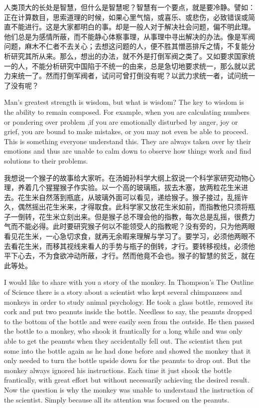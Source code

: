 {人类顶大的长处是智慧，但什么是智慧呢？智慧有一个要点，就是要冷静。譬如：正在计算数目，思索道理的时候，如果心里气恼，或喜乐、或悲伤，必致错误或简直不能进行。这是大家都明白的事。却是一般人对于解决社会问题，偏不明此理。他们总是为感情所蔽，而不能静心体察事理，从事理中寻出解决的办法。像是军阀问题，麻木不仁者不去关心；去想这问题的人，便不胜其憎恶排斥之情，不复能分析研究其所从来。那么，想出的办法，就不外是打倒军阀之类了。又如要求国家统一的人，不能分析研究中国陷于不统一的由来，总是急切地要求统一，那么就以武力来统一了。然而打倒军阀者，试问可曾打倒没有呢？以武力求统一者，试问统一了没有呢？
	
	Man's greatest strength is wisdom, but what is wisdom? The key to wisdom is the ability to remain composed. For example, when you are calculating numbers or pondering over problem ,if you are emotionally disturbed by anger, joy or grief, you are bound to make mistakes, or you may not even be able to proceed. This is something everyone understand this. They are always taken over by their emotions and thus are unable to calm down to observe how things work and find solutions to their problems.
	
	我想说一个猴子的故事给大家听。在汤姆孙科学大纲上叙说一个科学家研究动物心理，养着几个猩猩猴子作实验。以一个高的玻璃瓶，拔去木塞，放两粒花生米进去。花生米自然落到瓶底，从玻璃外面可以看见，递给猴子。猴子接过，乱摇许久，偶然摇出花生米来，才得取食。此科学家又放花生米如前，而指教他只须将瓶子一倒转，花生米立刻出来。但是猴子总不理会他的指教，每次总是乱摇，很费力气而不能必得。此时要研究猴子何以不能领受人的指教呢？没有旁的，只为他两眼看见花生米，一心急切求食，就再无余暇来理解与学习了。要学习，必须他两眼不去看花生米，而移其视线来看人的手势与瓶子的倒转，才行。要转移视线，必须他平下心去，不为食欲冲动所蔽，才行。然而他竟不会也。猴子的智慧的贫乏，就在此等处。
	
	I would like to share with you a story of the monkey. In Thompson's The Outline of Science there is a story about a scientist who kept several chimpanzees and monkeys in order to study animal psychology. He took a glass bottle, removed its cork and put two peanuts inside the bottle. Needless to say, the peanuts dropped to the bottom of the bottle and were easily seen from the outside. He then passed the bottle to a monkey, who shook it frantically for a long while and was only able to get the peanuts when they accidentally fell out. The scientist then put some into the bottle again as he had done before and showed the monkey that it only needed to turn the bottle upside down for the peanuts to drop out. But the monkey always ignored his instructions. Each time it just shook the bottle frantically, with great effort but without necessarily achieving the desired result. Now the question is why the monkey was unable to understand the instruction of the scientist. Simply because all its attention was focused on the peanuts.
	
}

